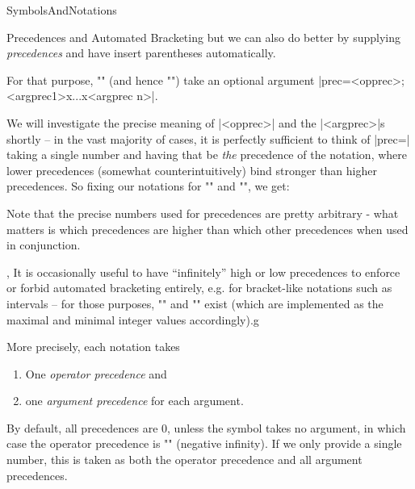 \begin{smodule}[ns=https://github.com/slatex/sTeX/doc]{SymbolsAndNotations}
\begin{sfragment}{Precedences and Automated Bracketing}
but we can also do better by supplying \emph{precedences} and
have \sTeX insert parentheses automatically.

For that purpose, \stexcode"\notation" (and hence \stexcode"\symdef") take an optional
argument |prec=<opprec>;<argprec1>x...x<argprec n>|.

We will investigate the precise meaning of |<opprec>| and the |<argprec>|s shortly -- in
the vast majority of cases, it is perfectly sufficient to think of |prec=| taking a single
number and having that be \emph{the} precedence of the notation, where lower precedences
(somewhat counterintuitively) bind stronger than higher precedences.  So fixing our
notations for \stexcode"\addition" and \stexcode"\multiplication", we get:


Note that the precise numbers used for precedences are pretty arbitrary - what matters is
which precedences are higher than which other precedences when used in conjunction.
\begin{variable}{\infprec,\neginfprec}
  It is occasionally useful to have ``infinitely'' high or low precedences to enforce or
  forbid automated bracketing entirely, e.g. for bracket-like notations such as intervals
  -- for those purposes, \stexcode"\infprec" and \stexcode"\neginfprec" exist (which are
  implemented as the maximal and minimal integer values accordingly).g
\end{variable}

\begin{dangerbox}
  More precisely, each notation takes
  \begin{enumerate}
  \item One \emph{operator precedence} and
  \item one \emph{argument precedence} for each argument.
  \end{enumerate}
  By default, all precedences are $0$, unless the symbol takes no argument, in which case
  the operator precedence is \stexcode"\neginfprec" (negative infinity). If we only
  provide a single number, this is taken as both the operator precedence and all argument
  precedences.


\end{dangerbox}
\end{sfragment}
\end{smodule}
